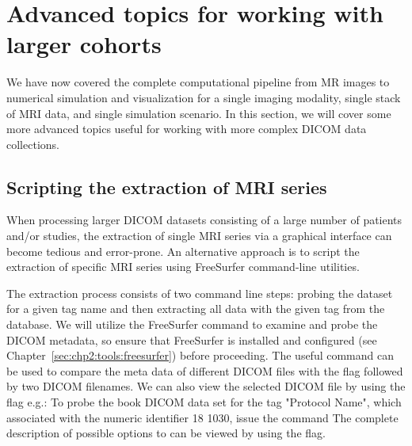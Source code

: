 


\section{Advanced topics for working with larger cohorts}
\label{sec:chp3:advanced}

We have now covered the complete computational pipeline from MR images
to numerical simulation and visualization for a single imaging
modality, single stack of MRI data, and single simulation scenario. In
this section, we will cover some more advanced topics useful for
working with more complex DICOM data collections.

\subsection{Scripting the extraction of MRI series}

When processing larger DICOM datasets consisting of a large number of
patients and/or studies, the extraction of single MRI series via a
graphical interface can become tedious and error-prone. An alternative
approach is to script the extraction of specific MRI series using
FreeSurfer command-line utilities.

The extraction process consists of two command line steps: probing the
dataset for a given tag name and then extracting all data with the
given tag from the database. We will utilize the FreeSurfer command
 to examine and probe the DICOM metadata, so
ensure that FreeSurfer is installed and configured (see
Chapter~\ref{sec:chp2:tools:freesurfer}) before proceeding. The useful
command  can be used to compare the meta
data of different DICOM files with the flag  followed
by two DICOM filenames. We can also view the selected DICOM file by
using the flag  e.g.:
\noindent To probe the book DICOM data set for the tag "Protocol Name", which
associated with the numeric identifier 18 1030, issue the command
\noindent The complete description of possible options to
 can be viewed by using the  flag.


